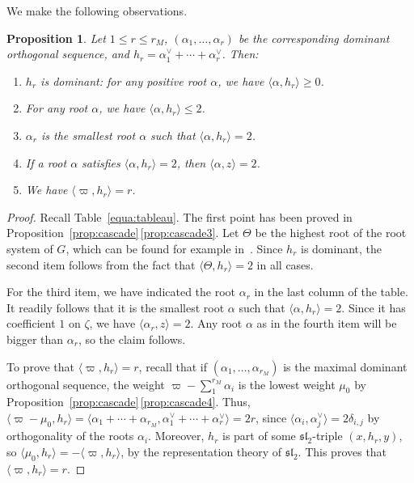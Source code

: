 \documentclass[JEP,XML,SOM,Unicode,NoFloatCountersInSection]{cedram}
\let\oldvee\vee
\renewcommand{\vee}{{\scriptscriptstyle\oldvee}}
\theoremstyle{plain}
\newtheorem{prop}[theo]{Proposition}
\theoremstyle{definition}
\newcommand{\fsl}{\mathfrak{sl}}
\newcommand{\rkm}{{r_M}}
\newcommand{\scal}[1]{\langle #1 \rangle}
\begin{document}
We make the following observations.

\begin{prop}\label{prop:h}
Let $1\leq r\leq \rkm$, $(\alpha_1,\ldots,\alpha_r)$ be the corresponding dominant orthogonal
sequence, and $h_r=\alpha_1^\vee + \cdots + \alpha_r^\vee$. Then:
\begin{enumerate}
\item \label{item:dominant} $h_r$ is dominant: for any positive root $\alpha$, we have $\scal{\alpha,h_r} \geq 0$.
\item \label{item:leq2} For any root $\alpha$, we have $\scal{\alpha,h_r} \leq 2$.
\item \label{item:smallest} $\alpha_r$ is the smallest root $\alpha$ such that $\scal{\alpha,h_r}=2$.
\item \label{item:scal} If a root $\alpha$ satisfies $\scal{\alpha,h_r} = 2$, then $\scal{\alpha,z}=2$.
\item \label{item:varpi} We have $\scal{\varpi,h_r}=r$.
\end{enumerate}
\end{prop}

\begin{proof}
Recall Table~\ref{equa:tableau}. The first point has been proved in Proposition~\ref{prop:cascade}\,\eqref{prop:cascade3}.
Let $\Theta$ be the highest root of the root system of $G$,
which can be found for example in~\cite{bourbaki}.
Since $h_r$ is dominant, the second item follows from the
fact that $\scal{\Theta,h_r}=2$ in all cases.

For the third item, we have indicated the root $\alpha_r$ in the last column of the table. It
readily follows that it is the smallest root $\alpha$ such that $\scal{\alpha,h_r}=2$.
Since it has coefficient $1$ on $\zeta$, we have $\scal{\alpha_r,z}=2$. Any root $\alpha$ as in
the fourth item will be bigger than $\alpha_r$, so the claim follows.

To prove that $\scal{\varpi,h_r}=r$, recall that if $(\alpha_1,\ldots,\alpha_\rkm)$ is the maximal dominant
orthogonal sequence, the weight
$\varpi- \sum_1^\rkm \alpha_i$ is the lowest weight $\mu_0$ by Proposition~\ref{prop:cascade}\,\eqref{prop:cascade4}. Thus,
$\scal{\varpi-\mu_0,h_r} = \scal{\alpha_1+\cdots+\alpha_\rkm,\alpha_1^\vee+\cdots+\alpha_r^\vee}=2r$,
since $\scal{\alpha_i,\alpha_j^\vee}=2\delta_{i,j}$ by orthogonality of the roots $\alpha_i$.
Moreover, $h_r$ is part of some $\fsl_2$\nobreakdash-triple $(x, h_r,y)$, so
$\scal{\mu_0, h_r}=-\scal{\varpi, h_r}$, by the representation theory of $\fsl_2$.
This proves that $\scal{\varpi, h_r}=r$.
\end{proof}
\end{document}
